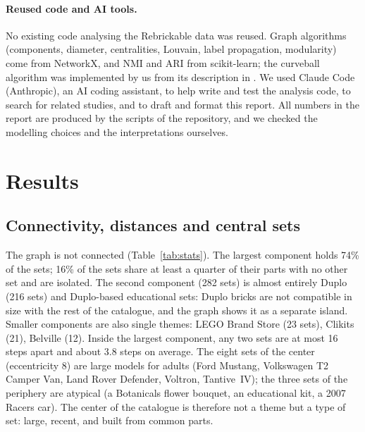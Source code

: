 \documentclass[10pt,a4paper]{article}
\begin{document}
\paragraph{Reused code and AI tools.} No existing code analysing the
Rebrickable data was reused. Graph algorithms (components, diameter,
centralities, Louvain, label propagation, modularity) come from NetworkX, and
NMI and ARI from scikit-learn; the curveball algorithm was implemented by us
from its description in \cite{strona2014}. We used Claude Code (Anthropic), an
AI coding assistant, to help write and test the analysis code, to search for
related studies, and to draft and format this report. All numbers in the
report are produced by the scripts of the repository, and we checked the
modelling choices and the interpretations ourselves.

\section{Results}
\label{sec:results}

\subsection{Connectivity, distances and central sets}

The graph is not connected (Table~\ref{tab:stats}). The largest component
holds 74\% of the sets; 16\% of the sets share at least a quarter of their
parts with no other set and are isolated. The second component (282 sets) is
almost entirely Duplo (216 sets) and Duplo-based educational sets: Duplo
bricks are not compatible in size with the rest of the catalogue, and the graph
shows it as a separate island. Smaller components are also single themes:
LEGO Brand Store (23 sets), Clikits (21), Belville (12). Inside the largest
component, any two sets are at most 16 steps apart and about 3.8 steps on
average. The eight sets of the center (eccentricity 8) are large models for
adults (Ford Mustang, Volkswagen T2 Camper Van, Land Rover Defender, Voltron,
Tantive~IV); the three sets of the periphery are atypical (a Botanicals flower
bouquet, an educational kit, a 2007 Racers car). The center of the catalogue is
therefore not a theme but a type of set: large, recent, and built from common
parts.
\end{document}
